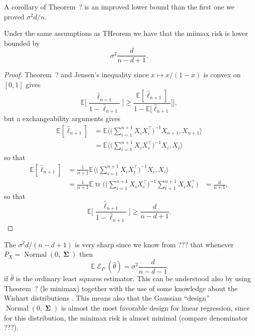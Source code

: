 \documentclass[
	fontsize=11pt, %
	twoside=false, %
	numbers=noenddot, %
]{kaobook}
\DeclareMathOperator{\cE}{\mathcal E}
\DeclareMathOperator{\bSigma}{\boldsymbol \Sigma}
\DeclareMathOperator{\tr}{tr}
\DeclareMathOperator{\nor}{Normal}
\newcommand{\E}{\mathbb E}
\newcommand{\wh}{\widehat}
\begin{document}
A corollary of Theorem~? is an improved lower bound than the first one we proved $\sigma^2 d / n$.

\begin{corollary}
	Under the same assumptions as THeorem we have that the miimax risk is lower bounded by
	\begin{equation*}
		\sigma^2 \frac{d}{n - d + 1}.
	\end{equation*}
\end{corollary}

\begin{proof}
	Theorem~? and Jensen's inequality since $x \mapsto x / (1-x)$ is convex on $[0, 1]$ gives
	\begin{equation*}
		\E \Big[ \frac{\wh \ell_{n+1}}{1 - \wh \ell_{n+1}} \Big] \geq \frac{\E[\wh \ell_{n+1}]}{1 - \E[\wh \ell_{n+1}}] \Big],
	\end{equation*}
	but a exchangeability arguments gives
	\begin{align*}
		\E [\wh \ell_{n + 1}] &= \E \Big \langle \Big( \sum_{i=1}^{n+1} X_i X_i^\top 
		\Big)^{-1} X_{n+1}, X_{n+1} \Big \rangle \\
		&= \E \Big \langle \Big( \sum_{i=1}^{n+1} X_i X_i^\top \Big)^{-1} X_{i}, X_{i} \Big \rangle
	\end{align*}
	so that
	\begin{align*}
	 	\E [\wh \ell_{n + 1}] &= \frac{1}{n+1} \E \Big \langle \Big( \sum_{i=1}^{n+1} X_i X_i^\top \Big)^{-1} X_{i}, X_{i} \Big \rangle \\
	 	&= \frac{1}{n+1}  \E \tr \bigg( \Big( \sum_{i=1}^{n+1} X_i X_i^\top \Big)^{-1} \sum_{i=1}^{n+1} X_i X_i^\top \bigg) 
	 	&= \frac{d}{n + 1},
	 \end{align*}
	so that
	\begin{equation*}
		\E \Big[ \frac{\wh \ell_{n+1}}{1 - \wh \ell_{n+1}} \Big] \geq \frac{d}{n - d + 1}.
	\end{equation*}
\end{proof}


The $\sigma^2 d / (n - d + 1)$ is very sharp since we know from ??? that whenever $P_X = \nor(0, \bSigma)$ then
\begin{equation*}
	\E \cE_P(\wh \theta) = \sigma^2 \frac{d}{n - d - 1}
\end{equation*}
if $\wh \theta$ is the ordinary least squares estimator. This can be understood also by using Theorem~? (le minimax) together with the use of some knowledge about the Wishart distributions .
This means also that the Gaussian ``design'' $\nor(0, \bSigma)$ is almost the most favorable design for linear regression, since for this distribution, the minimax risk is almost minimal (compare denominator ???).
\end{document}
